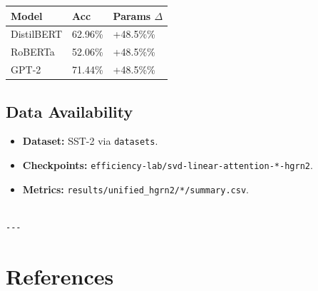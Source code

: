 \begin{table}[H]
\centering
\small
\begin{tabular}{lll}
\toprule
\textbf{Model} & \textbf{Acc} & \textbf{Params $\Delta$} \\
\midrule
DistilBERT & 62.96\% & +48.5\%\% \\
RoBERTa & 52.06\% & +48.5\%\% \\
GPT-2 & 71.44\% & +48.5\%\% \\
\bottomrule
\end{tabular}
\end{table}

\subsection{Data Availability}

\begin{itemize}
\item \textbf{Dataset:} SST-2 via \texttt{datasets}.
\item \textbf{Checkpoints:} \texttt{efficiency-lab/svd-linear-attention-*-hgrn2}.
\item \textbf{Metrics:} \texttt{results/unified\_hgrn2/*/summary.csv}.
\end{itemize}
\begin{lstlisting}

---
\end{lstlisting}

\section{References}


